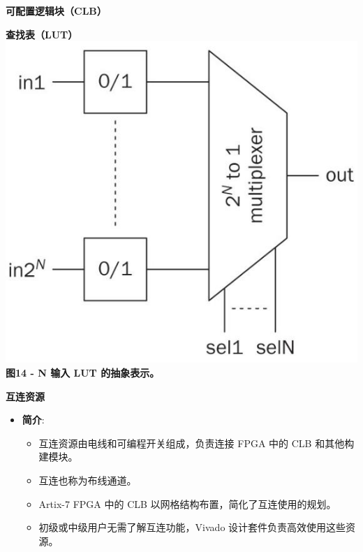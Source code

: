 \begin{frame}[allowframebreaks]{\textbf{可配置逻辑块（CLB）}}
\begin{block}{\textbf{查找表（LUT）}}
\includegraphics[keepaspectratio]{img1/XC7A35LUT.jpeg}\\
\textbf{图14 - N 输入 LUT 的抽象表示。}
\end{block}
\end{frame}

\begin{frame}{\textbf{互连资源}}
\label{ux4e92ux8fdeux8d44ux6e90}
\begin{itemize}
\tightlist
\item
    \textbf{简介}:

    \begin{itemize}
    \tightlist
    \item
    互连资源由电线和可编程开关组成，负责连接 FPGA 中的 CLB
    和其他构建模块。
    \item
    互连也称为布线通道。
    \item
    Artix-7 FPGA 中的 CLB 以网格结构布置，简化了互连使用的规划。
    \item
    初级或中级用户无需了解互连功能，Vivado
    设计套件负责高效使用这些资源。
    \end{itemize}
\end{itemize}
\end{frame}

